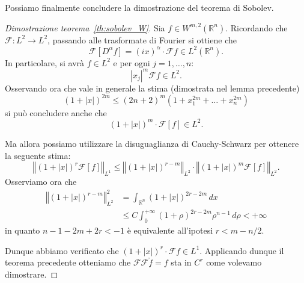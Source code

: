 \documentclass[italian,a4paper,oneside,headinclude]{scrbook}
\newcommand{\F}{\mathcal F}
\newcommand{\RR}{\mathbb R}
\newcommand{\abs}[1]{{\left|#1\right|}}
\newcommand{\Abs}[1]{{\left\Vert #1\right\Vert}}
\begin{document}
  Possiamo finalmente concludere la dimostrazione del teorema di Sobolev.
  \begin{proof}[Dimostrazione teorema~\ref{th:sobolev_W}]

    Sia $f\in W^{m,2}(\RR^n)$.
    Ricordando che $\F\colon L^2\to L^2$, passando alle trasformate di
    Fourier si ottiene che
    \[
    \F[D^\alpha f] = (ix)^\alpha \cdot \F f \in L^2(\RR^n).
    \]
    In particolare, si avrà $f\in L^2$ e per ogni $j=1,\dots,n$:
    \[
    \abs{x_j}^m \F f \in L^2.
    \]
    Osservando ora che vale in generale la stima (dimostrata nel lemma
    precedente)
    \[
      (1+\abs{x})^{2m} \le (2n+2)^m (1+x_1^{2m}+\dots+x_n^{2m})
    \]
    si può concludere anche che
    \[
      (1+\abs{x})^m \cdot \F[f] \in L^2.
    \]

    Ma allora possiamo utilizzare la disuguaglianza di Cauchy-Schwarz
    per ottenere la seguente stima:
    \[
    \Abs{(1+\abs{x})^r \F[ f]}_{L^1}
    \le \Abs{(1+\abs{x})^{r-m}}_{L^2}
    \cdot \Abs{(1+\abs{x})^m \F[f]}_{L^2}.
    \]
    Osserviamo ora che
    \begin{align*}
    \Abs{(1+\abs{x})^{r-m}}_{L^2}^2
    &= \int_{\RR^n} (1+\abs{x})^{2r-2m}\, dx\\
    &\le C \int_0^{+\infty} (1+\rho)^{2r-2m} \rho^{n-1}\,
    d\rho < +\infty
    \end{align*}
    in quanto $n-1-2m+2r < -1$ è equivalente all'ipotesi $r<m-n/2$.

    Dunque abbiamo verificato che $(1+\abs{x})^r \cdot \F f \in L^1$.
    Applicando dunque il teorema precedente otteniamo che
    $\F\F \check f =  f$ sta in $C^r$ come volevamo dimostrare.


\end{proof}
\end{document}
